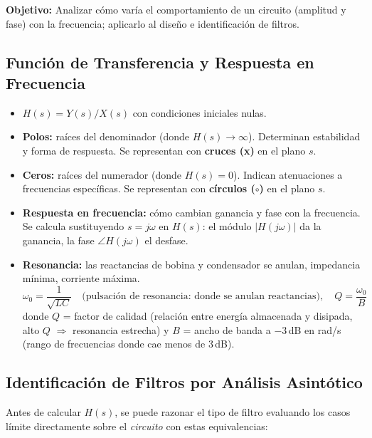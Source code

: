 \documentclass[12pt,a4paper]{article}
\begin{document}
\textbf{Objetivo:} Analizar cómo varía el comportamiento de un circuito (amplitud
y fase) con la frecuencia; aplicarlo al diseño e identificación de filtros.

\subsection{Función de Transferencia y Respuesta en Frecuencia}

\begin{itemize}[leftmargin=1.5em, itemsep=4pt]
  \item $H(s) = Y(s)/X(s)$ con condiciones iniciales nulas.
  \item \textbf{Polos:} raíces del denominador (donde $H(s)\to\infty$). Determinan estabilidad y forma de respuesta. Se representan con \textbf{cruces (x)} en el plano $s$.
  \item \textbf{Ceros:} raíces del numerador (donde $H(s) = 0$). Indican atenuaciones a frecuencias específicas. Se representan con \textbf{círculos ($\circ$)} en el plano $s$.
  \item \textbf{Respuesta en frecuencia:} cómo cambian ganancia y fase con la frecuencia. Se calcula sustituyendo $s = j\omega$ en $H(s)$: el módulo $|H(j\omega)|$ da la ganancia, la fase $\angle H(j\omega)$ el desfase.
  \item \textbf{Resonancia:} las reactancias de bobina y condensador se anulan, impedancia mínima, corriente máxima.
  \[
    \omega_0 = \frac{1}{\sqrt{LC}} \quad\text{(pulsación de resonancia: donde se anulan reactancias)}, \quad Q = \frac{\omega_0}{B}
  \]
  donde $Q$ = factor de calidad (relación entre energía almacenada y disipada, alto $Q$ $\Rightarrow$ resonancia estrecha)
  y $B$ = ancho de banda a $-3$\,dB en rad/s (rango de frecuencias donde cae menos de 3\,dB).
\end{itemize}

\subsection{Identificación de Filtros por Análisis Asintótico}

Antes de calcular $H(s)$, se puede razonar el tipo de filtro evaluando los casos
límite directamente sobre el \emph{circuito} con estas equivalencias:
\end{document}
